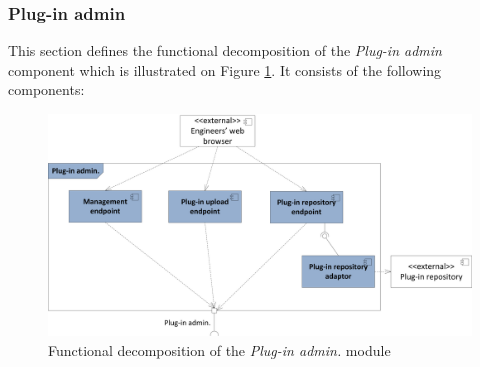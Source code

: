 \subsubsection{Plug-in admin}

This section defines the functional decomposition of the \textit{Plug-in admin} component which is illustrated on Figure \ref{fig_admin_func}. It consists of the following components:

\begin{figure}[h!]
  \centering
  	\includegraphics[scale=0.75]{plug-in/layers/admin-func.png}
  \caption{Functional decomposition of the \textit{Plug-in admin.} module}
  \label{fig_admin_func}
\end{figure}

